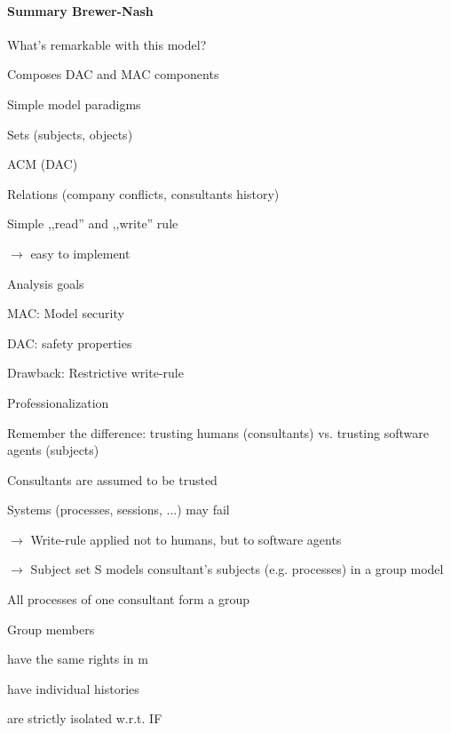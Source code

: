 \documentclass[a4paper]{article}
\begin{document}
\begin{multicols}{3}
    \paragraph{Summary Brewer-Nash}
    What’s remarkable with this model?
    \begin{itemize*}
        \item Composes DAC and MAC components
        \item Simple model paradigms
        \begin{itemize*}
            \item Sets (subjects, objects)
            \item ACM (DAC)
            \item Relations (company conflicts, consultants history)
            \item Simple ,,read'' and ,,write'' rule
            \item $\rightarrow$ easy to implement
        \end{itemize*}
        \item Analysis goals
        \begin{itemize*}
            \item MAC: Model security
            \item DAC: safety properties
        \end{itemize*}
        \item Drawback: Restrictive write-rule
    \end{itemize*}

    Professionalization
    \begin{itemize*}
        \item Remember the difference: trusting humans (consultants) vs. trusting software agents (subjects)
        \begin{itemize*}
            \item Consultants are assumed to be trusted
            \item Systems (processes, sessions, ...) may fail
        \end{itemize*}
        \item $\rightarrow$ Write-rule applied not to humans, but to software agents
        \item $\rightarrow$ Subject set S models consultant’s subjects (e.g. processes) in a group model
        \begin{itemize*}
            \item All processes of one consultant form a group
            \item Group members
            \begin{itemize*}
                \item have the same rights in m
                \item have individual histories
                \item are strictly isolated w.r.t. IF
            \end{itemize*}
        \end{itemize*}
    \end{itemize*}


\end{multicols}
\end{document}
